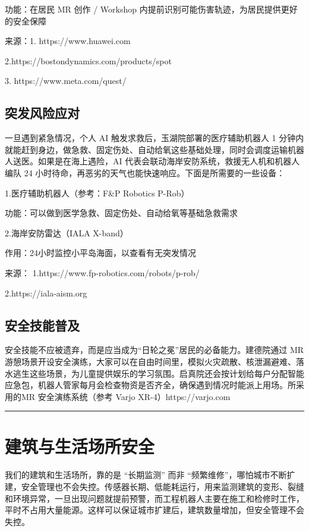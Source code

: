 功能：在居民 MR 创作 / Workshop 内提前识别可能伤害轨迹，为居民提供更好的安全保障

来源：1.
https://www.huawei.com

2.https://bostondynamics.com/products/spot

 3.
https://www.meta.com/quest/

\subsection{突发风险应对}\label{ux7a81ux53d1ux98ceux9669ux5e94ux5bf9}

一旦遇到紧急情况，个人 AI 触发求救后，玉湖院部署的医疗辅助机器人 1 分钟内就能赶到身边，做急救、固定伤处、自动给氧这些基础处理，同时会调度运输机器人送医。如果是在海上遇险，AI 代表会联动海岸安防系统，救援无人机和机器人编队 24 小时待命，再恶劣的天气也能快速响应。下面是所需要的一些设备：

1.医疗辅助机器人（参考：F\&P Robotics P-Rob）

功能：可以做到医学急救、固定伤处、自动给氧等基础急救需求

2.海岸安防雷达（IALA X-band）

作用：24小时监控小平岛海面，以查看有无突发情况

来源： 1.https://www.fp-robotics.com/robots/p-rob/

2.https://iala-aism.org

\subsection{安全技能普及}\label{ux5b89ux5168ux6280ux80fdux666eux53ca}

安全技能不应被遗弃，而是应当成为``日轮之冕''居民的必备能力。建德院通过 MR 游憩场景开设安全演练，大家可以在自由时间里，模拟火灾疏散、核泄漏避难、落水逃生这些场景，为儿童提供娱乐的学习氛围。启真院还会按计划给每户分配智能应急包，机器人管家每月会检查物资是否齐全，确保遇到情况时能派上用场。所采用的MR 安全演练系统（参考 Varjo XR-4）https://varjo.com

\begin{center}\rule{0.5\linewidth}{0.5pt}\end{center}

\section{建筑与生活场所安全}\label{ux5efaux7b51ux4e0eux751fux6d3bux573aux6240ux5b89ux5168}

我们的建筑和生活场所，靠的是 ``长期监测'' 而非 ``频繁维修''，哪怕城市不断扩建，安全管理也不会失控。传感器长期、低能耗运行，用来监测建筑的变形、裂缝和环境异常，一旦出现问题就提前预警，而工程机器人主要在施工和检修时工作，平时不占用大量能源。这样可以保证城市扩建后，建筑数量增加，但安全管理不会失控。

